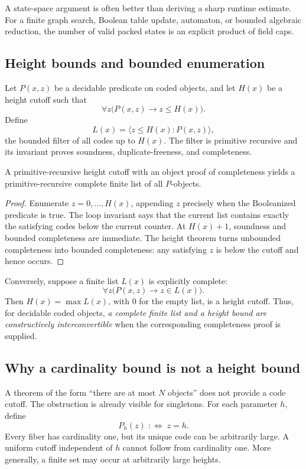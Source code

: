 A state-space argument is often better than deriving a sharp runtime estimate.  For a finite graph search,
Boolean table update, automaton, or bounded algebraic reduction, the number of valid packed states is an
explicit product of field caps.

\subsection{Height bounds and bounded enumeration}

Let \(P(x,z)\) be a decidable predicate on coded objects, and let \(H(x)\) be a height cutoff such that
\[
  \forall z\bigl(P(x,z)\to z\le H(x)\bigr).
\]
Define
\[
  L(x)=\langle z\le H(x):P(x,z)\rangle,
\]
the bounded filter of all codes up to \(H(x)\).  The filter is primitive recursive and its invariant proves
soundness, duplicate-freeness, and completeness.

\begin{theorem}
\label{thm:height-list}
A primitive-recursive height cutoff with an object proof of completeness yields a primitive-recursive
complete finite list of all \(P\)-objects.
\end{theorem}
\begin{proof}
Enumerate \(z=0,\ldots,H(x)\), appending \(z\) precisely when the Booleanized predicate is true.  The loop
invariant says that the current list contains exactly the satisfying codes below the current counter.  At
\(H(x)+1\), soundness and bounded completeness are immediate.  The height theorem turns unbounded
completeness into bounded completeness: any satisfying \(z\) is below the cutoff and hence occurs.
\end{proof}

Conversely, suppose a finite list \(L(x)\) is explicitly complete:
\[
  \forall z\bigl(P(x,z)\to z\in L(x)\bigr).
\]
Then \(H(x)=\max L(x)\), with \(0\) for the empty list, is a height cutoff.  Thus, for decidable coded
objects, \emph{a complete finite list and a height bound are constructively interconvertible} when the
corresponding completeness proof is supplied.

\subsection{Why a cardinality bound is not a height bound}

A theorem of the form ``there are at most \(N\) objects'' does not provide a code cutoff.  The obstruction is
already visible for singletons.  For each parameter \(h\), define
\[
  P_h(z)\;:\!\!\Longleftrightarrow\;z=h.
\]
Every fiber has cardinality one, but its unique code can be arbitrarily large.  A uniform cutoff independent
of \(h\) cannot follow from cardinality one.  More generally, a finite set may occur at arbitrarily large
heights.

